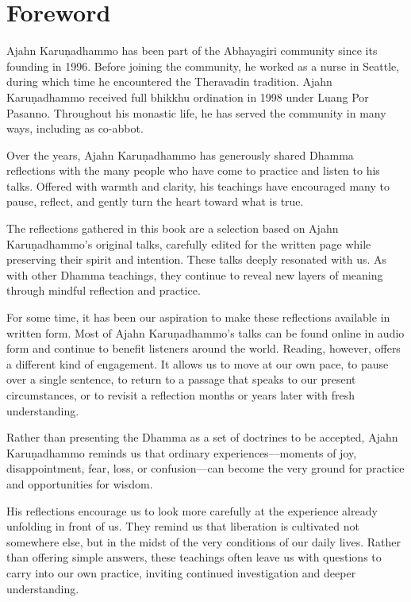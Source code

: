 \chapter{Foreword}

Ajahn Karuṇadhammo has been part of the Abhayagiri community since its founding in 1996. Before joining the community, he worked as a nurse in Seattle, during which time he encountered the Theravadin tradition. Ajahn Karuṇadhammo received full bhikkhu ordination in 1998 under Luang Por Pasanno. Throughout his monastic life, he has served the community in many ways, including as co-abbot.

Over the years, Ajahn Karuṇadhammo has generously shared Dhamma reflections with the many people who have come to practice and listen to his talks. Offered with warmth and clarity, his teachings have encouraged many to pause, reflect, and gently turn the heart toward what is true.

The reflections gathered in this book are a selection based on Ajahn Karuṇadhammo's original talks, carefully edited for the written page while preserving their spirit and intention. These talks deeply resonated with us. As with other Dhamma teachings, they continue to reveal new layers of meaning through mindful reflection and practice.

For some time, it has been our aspiration to make these reflections available in written form. Most of Ajahn Karuṇadhammo's talks can be found online in audio form and continue to benefit listeners around the world. Reading, however, offers a different kind of engagement. It allows us to move at our own pace, to pause over a single sentence, to return to a passage that speaks to our present circumstances, or to revisit a reflection months or years later with fresh understanding.

Rather than presenting the Dhamma as a set of doctrines to be accepted, Ajahn Karuṇadhammo reminds us that ordinary experiences---moments of joy, disappointment, fear, loss, or confusion---can become the very ground for practice and opportunities for wisdom.

His reflections encourage us to look more carefully at the experience already unfolding in front of us. They remind us that liberation is cultivated not somewhere else, but in the midst of the very conditions of our daily lives. Rather than offering simple answers, these teachings often leave us with questions to carry into our own practice, inviting continued investigation and deeper understanding.

